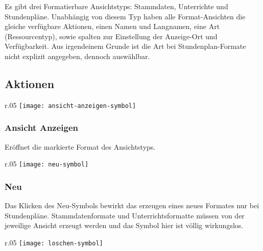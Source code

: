\noindent
Es gibt drei Formatierbare Ansichtstyps: Stammdaten, Unterrichte und Stundenpläne. Unabhängig von diesem Typ haben alle Format-Ansichten die gleiche verfügbare Aktionen, einen Namen und Langnamen, eine Art (Ressourcentyp), sowie spalten zur Einstellung der Anzeige-Ort und Verfügbarkeit. Aus irgendeinem Grunde ist die Art bei Stundenplan-Formate nicht explizit angegeben, dennoch auswählbar.\\

\subsection{Aktionen}

\begin{wrapfigure}{r}{.05\textwidth}
	\vspace{-14pt}
	\texttt{[image: ansicht-anzeigen-symbol]}
	\vspace{-40pt}
\end{wrapfigure}

\subsubsection{Ansicht Anzeigen}

\vspace{10pt}

\noindent
Eröffnet die markierte Format des Ansichtstyps.\\

\begin{wrapfigure}{r}{.05\textwidth}
	\vspace{-14pt}
	\texttt{[image: neu-symbol]}
	\vspace{-40pt}
\end{wrapfigure}

\subsubsection{Neu}

\vspace{10pt}

\noindent
Das Klicken des Neu-Symbols bewirkt das erzeugen eines neues Formates nur bei Stundenpläne. Stammdatenformate und Unterrichtsformatte müssen von der jeweilige Ansicht erzeugt werden und das Symbol hier ist völlig wirkungslos.\\

\begin{wrapfigure}{r}{.05\textwidth}
	\vspace{-14pt}
	\texttt{[image: loschen-symbol]}
	\vspace{-40pt}
\end{wrapfigure}

